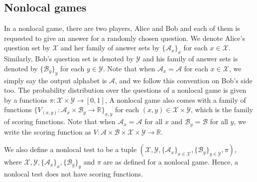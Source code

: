 \documentclass[11pt,letterpaper]{article}
\newcommand{\R}{\mathbb{R}}
\newcommand{\calX}{\mathcal{X}}
\newcommand{\calY}{\mathcal{Y}}
\newcommand{\calA}{\mathcal{A}}
\newcommand{\calB}{\mathcal{B}}
\newcommand{\1}{\mathbb{1}}
\theoremstyle{definition}
\begin{document}
\subsection{Nonlocal games}
In a nonlocal game, there are two players, Alice and Bob and each of them is requested
to give an answer for a randomly chosen question. 
We denote Alice's question set by $\calX$ and her family of answer sets by $\{\calA_x\}_x$
for each $x \in \calX$. Similarly,
Bob's question set is denoted by $\calY$ and 
his family of answer sets is denoted by $\{\calB_y\}_y$ for each $y \in \calY$. 
Note that when $\calA_x = \calA$ for each $x \in \calX$, we simply say the output alphabet is $\calA$, 
and we follow this convention on Bob's side too.
The probability distribution over the questions of
a nonlocal game 
is given by a functions $\pi: \calX \times \calY \rightarrow [0,1]$,
A nonlocal game also comes with a family of functions $\{ V_{(x,y)} : \calA_x \times \calB_y \rightarrow \R \}_{x,y}$ for each $(x,y) \in \calX \times \calY$, which is 
the family of scoring functions.
Note that when $\calA_x = \calA$ for all $x$ and $\calB_y = \calB$ for all $y$, we write the scoring function as 
$V: \calA \times \calB \times \calX \times \calY \rightarrow \R$.


We also define a nonlocal test 
to be a tuple $(\calX, \calY, \{\calA_x\}_{x \in \calX}, \{\calB_y\}_{y \in \calY}, \pi)$, where
$\calX, \calY, \{\calA_x\}_{x}, \{\calB_y\}_{y}$ and $\pi$ are as defined for a nonlocal game.
Hence, a nonlocal test does not have scoring functions.
\end{document}
